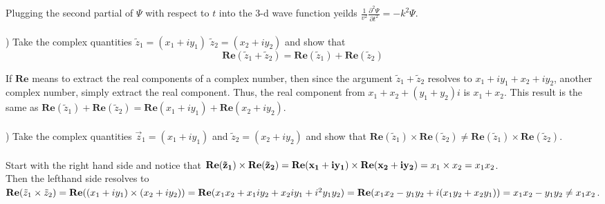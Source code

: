 \documentclass[12pt]{article}
\begin{document}
\noindent Plugging the second partial of $\Psi$ with respect to $t$ 
into the 3-d wave function yeilds 
$\frac{1}{v^{2}}\frac{\partial ^{2} \Psi}{\partial t^{2}} = -k^{2}\Psi$.\\\\


) Take the complex quantities $\tilde{z}_{1} = (x_{1}+iy_{1})$
$\tilde{z}_{2} = (x_{2}+iy_{2})$ and show that \\ 
\[\mathbf{Re}(\tilde{z}_{1} + \tilde{z}_{2}) 
= \mathbf{Re}(\tilde{z}_{1}) + \mathbf{Re}(\tilde{z}_{2})\]

\noindent If $\mathbf{Re}$ means to extract the real components of a complex number, then 
since the argument $\tilde{z}_{1} + \tilde{z}_{2}$ resolves to 
$x_{1} + iy_{1} + x_{2} + iy_{2}$, another complex number, simply extract the real component. Thus, the real component from $x_{1} + x_{2} + (y_{1} + y_{2})i$ is 
$x_{1} + x_{2}$. This result is the same as $\mathbf{Re}(\tilde{z}_{1}) + \mathbf{Re}(\tilde{z}_{2}) = \mathbf{Re}(x_{1} + iy_{1}) + \mathbf{Re}(x_{2} + iy_{2})$.\\\\



) Take the complex quantities $\vec{z}_{1} = (x_{1} + iy_{1})$
and $\tilde{z}_{2} = (x_{2}+iy_{2})$ and show that 
$\mathbf{Re}(\tilde{z}_{1}) \times \mathbf{Re}(\tilde{z}_{2})
\neq \mathbf{Re}(\tilde{z}_{1}) \times \mathbf{Re}(\tilde{z}_{2})$.\\\\

\noindent Start with the right hand side and notice that 
$\\\mathbf{Re(\tilde{z}_{1})} \times \mathbf{Re(\tilde{z}_{2})}
\\=\mathbf{Re(x_{1} + iy_{1})} \times \mathbf{Re(x_{2} + iy_{2})}
\\=x_{1} \times x_{2} = x_{1}x_{2}$.\\

\noindent Then the lefthand side resolves to 
$\\ \mathbf{Re}(\tilde{z}_{1} \times \tilde{z}_{2})
\\= \mathbf{Re}((x_{1} + iy_{1})\times(x_{2} + iy_{2}))
\\= \mathbf{Re}(x_{1}x_{2} + x_{1}iy_{2} + x_{2}iy_{1} + i^{2}y_{1}y_{2})
\\= \mathbf{Re}(x_{1}x_{2} - y_{1}y_{2} + i(x_{1}y_{2} + x_{2}y_{1}))
\\= x_{1}x_{2}-y_{1}y_{2} \neq x_{1}x_{2}$. \\\\
\end{document}

